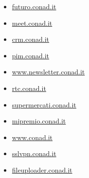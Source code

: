 \documentclass{article}
\begin{document}
\begin{itemize}
        
        
        \item \href{ https://futuro.conad.it/ }{ futuro.conad.it }
    
        
        
        \item \href{ https://meet.conad.it/ }{ meet.conad.it }
    
        
        
        \item \href{ http://crm.conad.it }{ crm.conad.it }
    
        
        
        \item \href{ https://pim.conad.it/ }{ pim.conad.it }
    
        
        
        \item \href{ https://www.newsletter.conad.it/ }{ www.newsletter.conad.it }
    
        
        
        \item \href{ http://rtc.conad.it }{ rtc.conad.it }
    
        
        
        \item \href{ http://supermercati.conad.it/ }{ supermercati.conad.it }
    
        
        
        \item \href{ https://mipremio.conad.it/ }{ mipremio.conad.it }
    
        
        
        \item \href{ https://www.conad.it/?utm\_source=google\&utm\_medium=cpc\&utm\_campaign=cnd\_wpp\_conad\&utm\_content=conadit\&utm\_term=sea\&s\_kwcid=AL!13157!3!646015855084!e!!g!!conad\&gclid=CjwKCAiA\_6yfBhBNEiwAkmXy58ytQtGD\_SxOBMipzUWBv7BOcasOdBDb4TCAn2r-KzU8n2dw7E0CGBoCbHQQAvD\_BwE }{ www.conad.it }
    
        
        
        \item \href{ http://sslvpn.conad.it }{ sslvpn.conad.it }
    
        
        
        \item \href{ http://fileuploader.conad.it }{ fileuploader.conad.it }
    
        
        

\end{itemize}
\end{document}
